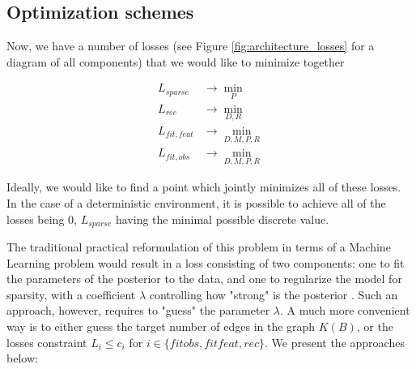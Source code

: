 \documentclass[a4paper,11pt,oneside]{report}
\begin{document}

\subsection{Optimization schemes}
Now, we have a number of losses (see Figure \ref{fig:architecture_losses} for a diagram of all components) that we would like to minimize together

\begin{equation}
\label{eq:all_losses}
\begin{array}{lc}
L_{sparse}&\to\min\limits_P\\
L_{rec}&\to\min\limits_{D,R}\\
L_{fit, feat}&\to\min\limits_{D,M,P,R}\\
L_{fit, obs}&\to\min\limits_{D,M,P,R}
\end{array}
\end{equation}

Ideally, we would like to find a point which jointly minimizes all of these losses. In the case of a deterministic environment, it is possible to achieve all of the losses being $0$, $L_{sparse}$ having the minimal possible discrete value.

The traditional practical reformulation of this problem in terms of a Machine Learning problem would result in a loss consisting of two components: one to fit the parameters of the posterior to the data, and one to regularize the model for sparsity, with a coefficient $\lambda$ controlling how "strong" is the posterior \cite{Seeger2007}.
Such an approach, however, requires to "guess" the parameter $\lambda$.
A much more convenient way is to either guess the target number of edges in the graph $K(B)$, or the losses constraint $L_i\leq c_i$ for $i\in\{fitobs, fitfeat, rec\}$.
We present the approaches below:
\end{document}
